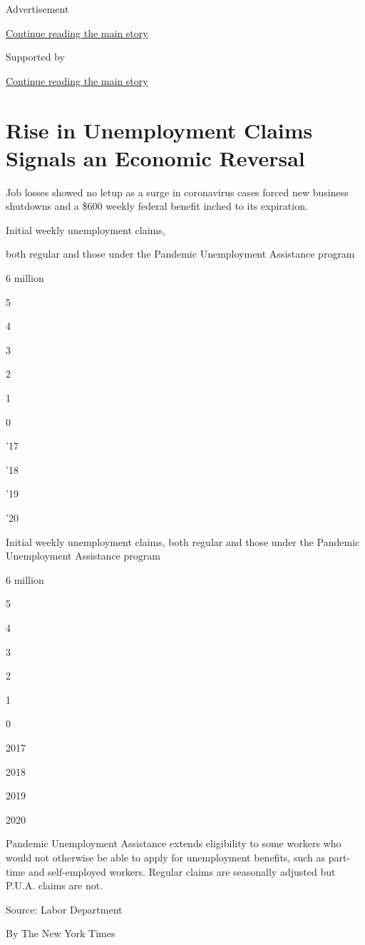Advertisement

\protect\hyperlink{after-top}{Continue reading the main story}

Supported by

\protect\hyperlink{after-sponsor}{Continue reading the main story}

\hypertarget{rise-in-unemployment-claims-signals-an-economic-reversal}{%
\section{Rise in Unemployment Claims Signals an Economic
Reversal}\label{rise-in-unemployment-claims-signals-an-economic-reversal}}

Job losses showed no letup as a surge in coronavirus cases forced new
business shutdowns and a \$600 weekly federal benefit inched to its
expiration.

Initial weekly unemployment claims,

both regular and those under the Pandemic Unemployment Assistance
program

6 million

5

4

3

2

1

0

'17

'18

'19

'20

Initial weekly unemployment claims, both regular and those under the
Pandemic Unemployment Assistance program

6 million

5

4

3

2

1

0

2017

2018

2019

2020

Pandemic Unemployment Assistance extends eligibility to some workers who
would not otherwise be able to apply for unemployment benefits, such as
part-time and self-employed workers. Regular claims are seasonally
adjusted but P.U.A. claims are not.

Source: Labor Department

By The New York Times

